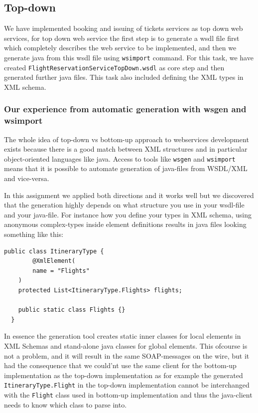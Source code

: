\documentclass[a4paper, 11pt]{article}
\begin{document}
\subsection*{Top-down}
We have implemented booking and issuing of tickets services as top down web services, for top down web service the first step is to generate a wsdl file first which completely describes the web service to be implemented, and then we generate java from this wsdl file using \texttt{wsimport} command. For this task, we have created \texttt{FlightReservationServiceTopDown.wsdl} as core step and then generated further java files. This task also included defining the XML types in XML schema.


\subsubsection*{Our experience from automatic generation with wsgen and wsimport}
The whole idea of top-down vs bottom-up approach to webservices development exists because there is a good match between XML structures and in particular object-oriented languages like java. Access to tools like \texttt{wsgen} and \texttt{wsimport} means that it is possible to automate generation of java-files from WSDL/XML and vice-versa.

In this assignment we applied both directions and it works well but we discovered that the generation highly depends on what structure you use in your wsdl-file and your java-file. For instance how you define your types in XML schema, using anonymous complex-types inside element definitions results in java files looking something like this:
\begin{lstlisting}[frame=single,style=java]
  public class ItineraryType {
        @XmlElement(
        name = "Flights"
    )
    protected List<ItineraryType.Flights> flights;

    public static class Flights {}
  }    
\end{lstlisting}
In essence the generation tool creates static inner classes for local elements in XML Schemas and stand-alone java classes for global elements. This ofcourse is not a problem, and it will result in the same SOAP-messages on the wire, 
but it had the consequence that we could'nt use the same client for the bottom-up implementation as the top-down implementation as for example the generated \texttt{ItineraryType.Flight} in the top-down implementation cannot be interchanged with the \texttt{Flight} class used in bottom-up implementation and thus the java-client needs to know which class to parse into. 
\end{document}
